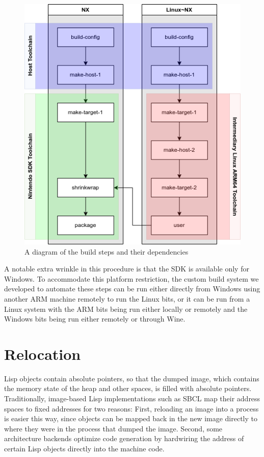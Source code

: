 \documentclass[format=sigconf]{acmart}
\begin{document}
\begin{figure}[h]
  \centering
  \includegraphics[width=\linewidth]{build.png}
  \caption{A diagram of the build steps and their dependencies}
\end{figure}


A notable extra wrinkle in this procedure is that the SDK is available only for Windows. To accommodate this platform restriction, the custom build system we developed to automate these steps can be run either directly from Windows using another ARM machine remotely to run the Linux bits, or it can be run from a Linux system with the ARM bits being run either locally or remotely and the Windows bits being run either remotely or through Wine\cite{amstadt1994wine}.

\section{Relocation}\label{relocation}
Lisp objects contain absolute pointers, so that the dumped image, which contains the memory state of the heap and other spaces, is filled with absolute pointers. Traditionally, image-based Lisp implementations such as SBCL map their address spaces to fixed addresses for two reasons: First, reloading an image into a process is easier this way, since objects can be mapped back in the new image directly to where they were in the process that dumped the image. Second, some architecture backends optimize code generation by hardwiring the address of certain Lisp objects directly into the machine code.
\end{document}
